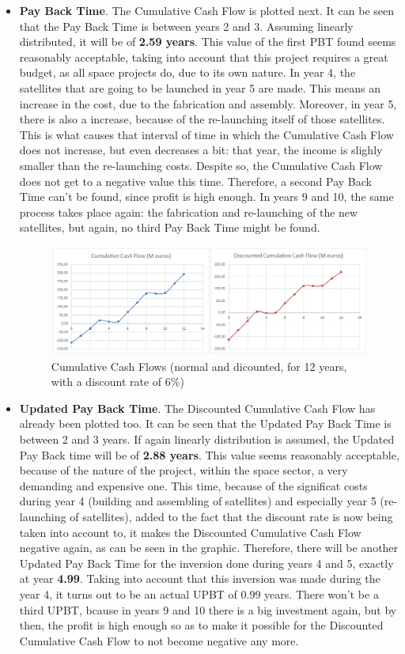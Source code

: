

\begin{itemize}
\item \textbf{Pay Back Time}. The Cumulative Cash Flow is plotted next. It can be seen that the Pay Back Time is between years 2 and 3. Assuming linearly distributed, it will be of \textbf{2.59 years}. This value of the first PBT found seems reasonably acceptable, taking into account that this project requires a great budget, as all space projects do, due to its own nature. In year 4, the satellites that are going to be launched in year 5 are made. This means an increase in the cost, due to the fabrication and assembly. Moreover, in year 5, there is also a increase, because of the re-launching itself of those satellites. This is what causes that interval of time in which the Cumulative Cash Flow does not increase, but even decreases a bit: that year, the income is slighly smaller than the re-launching costs. Despite so, the Cumulative Cash Flow does not get to a negative value this time. Therefore, a second Pay Back Time can't be found, since profit is high enough. In years 9 and 10, the same process takes place again: the fabrication and re-launching of the new satellites, but again, no third Pay Back Time might be found. 
\begin{figure}
\centering
\includegraphics[width=140mm]{CCFTogether.png}
\caption[Cumulative Cash Flows (normal and discounted)]{Cumulative Cash Flows (normal and dicounted, for 12 years, with a discount rate of 6\%)}
\end{figure}
\item \textbf{Updated Pay Back Time}. The Discounted Cumulative Cash Flow has already been plotted too. It can be seen that the Updated Pay Back Time is between 2 and 3 years. If again linearly distribution is assumed, the Updated Pay Back time will be of \textbf{2.88 years}. This value seems reasonably acceptable, because of the nature of the project, within the space sector, a very demanding and expensive one.
This time, because of the significat costs during year 4 (building and assembling of satellites) and especially year 5 (re-launching of satellites), added to the fact that the discount rate is now being taken into account to, it makes the Discounted Cumulative Cash Flow negative again, as can be seen in the graphic. Therefore, there will be another Updated Pay Back Time for the inversion done during years 4 and 5, exactly at year \textbf{4.99}. Taking into account that this inversion was made during the year 4, it turns out to be an actual UPBT of 0.99 years. There won't be a third UPBT, bcause in years 9 and 10 there is a big investment again, but by then, the profit is high enough so as to make it possible for the Discounted Cumulative Cash Flow to not become negative any more. 

\end{itemize}
